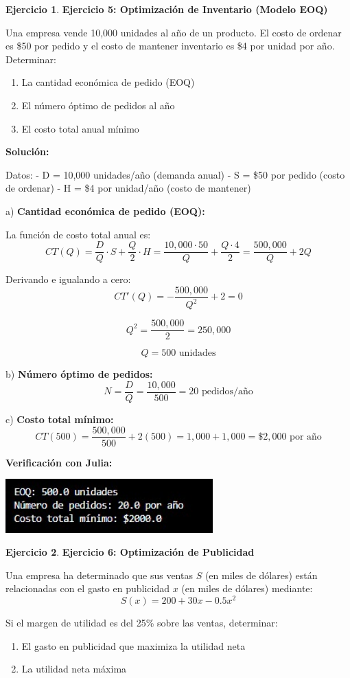 \documentclass[12pt, a4paper, oneside]{book}
\theoremstyle{definition}
\newtheorem{ejercicio}{Ejercicio}[chapter]
\begin{document}
\begin{ejercicio}
\textbf{Ejercicio 5: Optimización de Inventario (Modelo EOQ)}

Una empresa vende 10,000 unidades al año de un producto. El costo de ordenar es \$50 por pedido y el costo de mantener inventario es \$4 por unidad por año. Determinar:
\begin{enumerate}[label=\alph*)]
    \item La cantidad económica de pedido (EOQ)
    \item El número óptimo de pedidos al año
    \item El costo total anual mínimo
\end{enumerate}
\end{ejercicio}

\textbf{Solución:}

Datos:
- D = 10,000 unidades/año (demanda anual)
- S = \$50 por pedido (costo de ordenar)
- H = \$4 por unidad/año (costo de mantener)

a) \textbf{Cantidad económica de pedido (EOQ):}

La función de costo total anual es:
$$CT(Q) = \frac{D}{Q} \cdot S + \frac{Q}{2} \cdot H = \frac{10,000 \cdot 50}{Q} + \frac{Q \cdot 4}{2} = \frac{500,000}{Q} + 2Q$$

Derivando e igualando a cero:
$$CT'(Q) = -\frac{500,000}{Q^2} + 2 = 0$$

$$Q^2 = \frac{500,000}{2} = 250,000$$

$$Q = 500 \text{ unidades}$$

b) \textbf{Número óptimo de pedidos:}
$$N = \frac{D}{Q} = \frac{10,000}{500} = 20 \text{ pedidos/año}$$

c) \textbf{Costo total mínimo:}
$$CT(500) = \frac{500,000}{500} + 2(500) = 1,000 + 1,000 = \$2,000 \text{ por año}$$

\textbf{Verificación con Julia:}


\begin{center}
\includegraphics[width=0.6\textwidth]{ejercicio5fm.png}
\end{center}

\begin{ejercicio}
\textbf{Ejercicio 6: Optimización de Publicidad}

Una empresa ha determinado que sus ventas $S$ (en miles de dólares) están relacionadas con el gasto en publicidad $x$ (en miles de dólares) mediante:
$$S(x) = 200 + 30x - 0.5x^2$$

Si el margen de utilidad es del 25\% sobre las ventas, determinar:
\begin{enumerate}[label=\alph*)]
    \item El gasto en publicidad que maximiza la utilidad neta
    \item La utilidad neta máxima
\end{enumerate}
\end{ejercicio}
\end{document}
